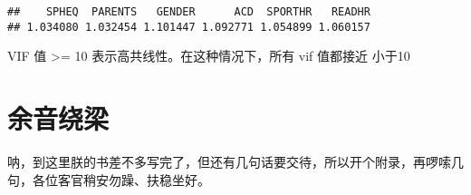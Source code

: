 \documentclass[]{ctexbook}
\begin{document}
\begin{verbatim}
##    SPHEQ  PARENTS   GENDER      ACD  SPORTHR   READHR 
## 1.034080 1.032454 1.101447 1.092771 1.054899 1.060157
\end{verbatim}

VIF 值 \textgreater= 10 表示高共线性。在这种情况下，所有 vif 值都接近 小于10

\cleardoublepage

\hypertarget{appendix-ux9644ux5f55}{%
\appendix {}}


\hypertarget{sound}{%
\chapter{余音绕梁}\label{sound}}

呐，到这里朕的书差不多写完了，但还有几句话要交待，所以开个附录，再啰嗦几句，各位客官稍安勿躁、扶稳坐好。



\backmatter
\printindex
\end{document}
